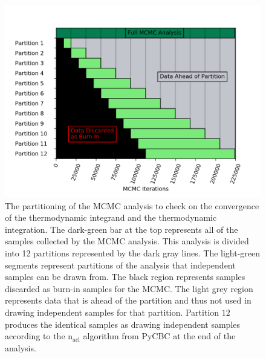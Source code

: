 \begin{figure}[th]
\centering
\includegraphics[width=1.0\columnwidth]{figs/chapter6/convergence_segmentation_lvc_sim.png}
\caption{The partitioning of the MCMC analysis to check on the convergence of the thermodynamic integrand and the thermodynamic integration. The dark-green bar at the top represents all of the samples collected by the MCMC analysis. This analysis is divided into 12 partitions represented by the dark gray lines. The light-green segments represent partitions of the analysis that independent samples can be drawn from. The black region represents samples discarded as burn-in samples for the MCMC. The light grey region represents data that is ahead of the partition and thus not used in drawing independent samples for that partition. Partition $12$ produces the identical samples as drawing independent samples according to the $\mathrm{n_{acl}}$ algorithm from PyCBC at the end of the analysis.}
\label{fig:nacl_segments}
\end{figure}

